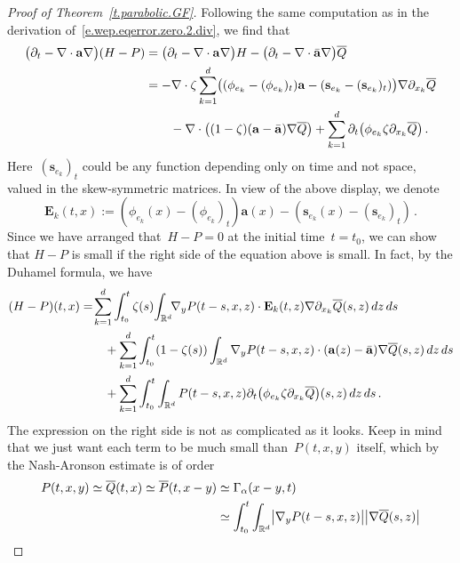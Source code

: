 \documentclass[11pt]{article} %
\numberwithin{equation}{section}
\theoremstyle{definition}
\newcommand*{\Rd}{\ensuremath{\mathbb{R}^d}}
\newcommand{\s}{\mathbf{s}}
\renewcommand{\a}{\mathbf{a}}
\newcommand{\ahom}{\bar{\a}}
\begin{document}
\begin{proof}[{Proof of Theorem~\ref{t.parabolic.GF}}]
Following the same computation as in the derivation of~\eqref{e.wep.eqerror.zero.2.div}, we find that 
\begin{align*}
\bigl( \partial_t - \nabla \cdot \a\nabla\bigr) (H-P) 
&
=
\bigl( \partial_t - \nabla \cdot \a\nabla\bigr) H 
-
\bigl( \partial_t - \nabla \cdot \ahom\nabla\bigr) \overline{Q}
\notag \\ & 
=
-\nabla \cdot \zeta \sum_{k=1}^d 
\bigl( (\phi_{e_k} - (\phi_{e_k})_t)  \a   - (\s_{e_k} - (\s_{e_k})_t ) \bigr) \nabla \partial_{x_k} \overline{Q} 
\notag  \\ & \qquad 
-
\nabla \cdot \bigl( (1-\zeta)(\a  - \ahom) \nabla \overline{Q}  \bigr)
+
\sum_{k=1}^d
  \partial_t \bigl( \phi_{e_k} \zeta \partial_{x_k}  \overline{Q}\bigr)
\,.
\end{align*}
Here~$(\s_{e_k})_t$ could be any function depending only on time and not space, valued in the skew-symmetric matrices. 
In view of the above display, we denote 
\begin{equation*}  
\mathbf{E}_k(t,x) :=  (\phi_{e_k}(x) - (\phi_{e_k})_t)  \a(x)   - (\s_{e_k}(x) - (\s_{e_k})_t )\,.
\end{equation*}
Since we have arranged that~$H - P = 0$ at the initial time~$t=t_0$, 
we can show that $H-P$ is small if the right side of the equation above is small. In fact, by the Duhamel formula, we have
\begin{align}
\label{e.identity.HP}
(H-P)(t,x)
&
= 
\! \sum_{k=1}^d
\int_{t_0}^{t}
\zeta(s) \!
\int_{\Rd}  \!\!
\nabla_y P(t-s,x,z) 
\cdot
\mathbf{E}_k(t,z)\nabla \partial_{x_k} \overline{Q} (s,z)\,dz\,ds
\notag \\ & \qquad 
+
\sum_{k=1}^d
\int_{t_0}^{t}
(1-\zeta(s))
\int_{\Rd} 
\nabla_y P(t-s,x,z) 
\cdot (\a(z)-\ahom) \nabla\overline{Q}(s,z)\,dz\,ds
\notag \\ & \qquad 
+
\sum_{k=1}^d
\int_{t_0}^{t}
\int_{\Rd}
P(t-s,x,z) \partial_t \bigl( \phi_{e_k} \zeta \partial_{x_k}  \overline{Q}\bigr) (s,z)
\,dz\,ds
\,.
\end{align}
The expression on the right side is not as complicated as it looks. Keep in mind that we just want each term to be much small than~$P(t,x,y)$ itself, which by the Nash-Aronson estimate is of order 
\begin{align}
\label{e.sameorderasP}
P(t,x,y) \simeq \overline{Q}(t,x) \simeq \overline{P}(t,x-y) 
&
\simeq \Gamma_\alpha(x-y,t)
\notag \\ &
\simeq 
\int_{t_0}^{t}
\int_{\Rd} 
\bigl| 
\nabla_y P(t-s,x,z) 
\bigr|
\bigl| 
\nabla \overline{Q} (s,z)
\bigr| 

\end{align}
\end{proof}
\end{document}
